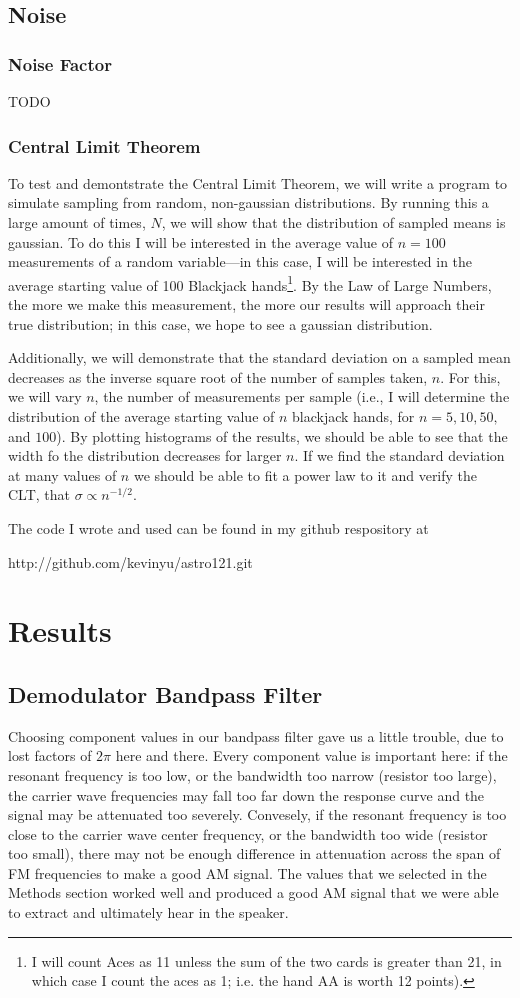 \documentclass[12pt]{article}
\begin{document}
\subsection*{Noise}
\subsubsection*{Noise Factor}
TODO
\subsubsection*{Central Limit Theorem}
To test and demontstrate the Central Limit Theorem, we will write a program to simulate sampling from random, non-gaussian distributions. By running this a large amount of times, $N$, we will show that the distribution of sampled means is gaussian. To do this I will be interested in the average value of $n=100$ measurements of a random variable---in this case, I will be interested in the average starting value of 100 Blackjack hands\footnote{I will count Aces as 11 unless the sum of the two cards is greater than 21, in which case I count the aces as 1; i.e. the hand AA is worth 12 points).}. By the Law of Large Numbers, the more we make this measurement, the more our results will approach their true distribution; in this case, we hope to see a gaussian distribution.

Additionally, we will demonstrate that the standard deviation on a sampled mean decreases as the inverse square root of the number of samples taken, $n$. For this, we will vary $n$, the number of measurements per sample (i.e., I will determine the distribution of the average starting value of $n$ blackjack hands, for $n=5,10,50,$ and $100$). By plotting histograms of the results, we should be able to see that the width fo the distribution decreases for larger $n$. If we find the standard deviation at many values of $n$ we should be able to fit a power law to it and verify the CLT, that $\sigma \propto n^{-1/2}$.

The code I wrote and used can be found in my github respository at

 http://github.com/kevinyu/astro121.git

\section*{Results}
\subsection*{Demodulator Bandpass Filter}
Choosing component values in our bandpass filter gave us a little trouble, due to lost factors of $2\pi$ here and there. Every component value is important here: if the resonant frequency is too low, or the bandwidth too narrow (resistor too large), the carrier wave frequencies may fall too far down the response curve and the signal may be attenuated too severely. Convesely, if the resonant frequency is too close to the carrier wave center frequency, or the bandwidth too wide (resistor too small), there may not be enough difference in attenuation across the span of FM frequencies to make a good AM signal. The values that we selected in the Methods section worked well and produced a good AM signal that we were able to extract and ultimately hear in the speaker.  
\end{document}

